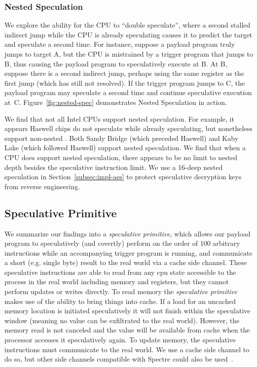\subsubsection{Nested Speculation}
\label{sssec:nested-spec}

We explore the ability for the CPU to ``double speculate'', where a second
stalled indirect jump while the CPU is already speculating causes it to predict
the target and speculate a second time. For instance, suppose a payload program
truly jumps to target A, but the CPU is mistrained by a trigger program that
jumps to B, thus causing the payload program to speculatively execute at B. At
B, suppose there is a second indirect jump, perhaps using the same register as
the first jump (which has still not resolved). If the trigger program jumps to
C, the payload program may speculate a second time and continue speculative
execution at~C. Figure~\ref{fig:nested-spec} demonstrates Nested Speculation in
action.

We find that not all Intel CPUs support nested speculation. For
example, it appears Haswell chips do not speculate while already speculating,
but nonetheless support non-nested \speculake. Both Sandy Bridge (which
preceded Haswell) and Kaby Lake (which followed Haswell) support nested
speculation. We find that when a CPU does support nested speculation, there
appears to be no limit to nested depth besides the speculative instruction
limit. We use a 16-deep nested speculation in Section~\ref{subsec:impl-aes}
to protect speculative decryption keys from reverse
engineering.

\subsection{Speculative Primitive}

We summarize our findings into a \emph{speculative primitive}, which allows our
payload program to speculatively (and covertly) perform on the order of 100
arbitrary instructions while an accompanying trigger program is running, and
communicate a short (e.g. single byte) result to the real world via a cache side
channel. These speculative instructions are able to read from any cpu state 
accessible to the process in the real world including memory and registers, 
but they cannot perform updates 
or writes directly. To read memory the \emph{speculative primitive} makes use
of the ability to bring things into cache. If a load for an uncached memory 
location is initiated speculatively it will not finish within the speculative 
window (meaning no value can be exfiltrated to the real world). However, the 
memory read is not canceled and the value will be available from cache when 
the processor accesses it speculatively again. To update memory, the speculative 
instructions must communicate to the real world.  We use a cache side channel 
to do so, but other side channels compatible with Spectre could also 
be used~\cite{kiriansky2018speculative}.

